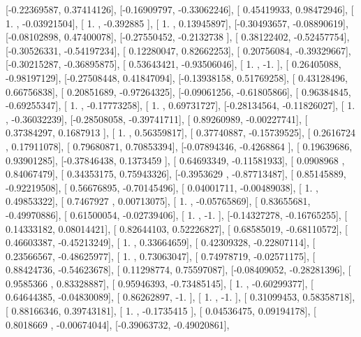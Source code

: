 \documentclass{article}
\begin{document}
       [-0.22369587,  0.37414126],
       [-0.16909797, -0.33062246],
       [ 0.45419933,  0.98472946],
       [ 1.        , -0.03921504],
       [ 1.        , -0.392885  ],
       [ 1.        ,  0.13945897],
       [-0.30493657, -0.08890619],
       [-0.08102898,  0.47400078],
       [-0.27550452, -0.2132738 ],
       [ 0.38122402, -0.52457754],
       [-0.30526331, -0.54197234],
       [ 0.12280047,  0.82662253],
       [ 0.20756084, -0.39329667],
       [-0.30215287, -0.36895875],
       [ 0.53643421, -0.93506046],
       [ 1.        , -1.        ],
       [ 0.26405088, -0.98197129],
       [-0.27508448,  0.41847094],
       [-0.13938158,  0.51769258],
       [ 0.43128496,  0.66756838],
       [ 0.20851689, -0.97264325],
       [-0.09061256, -0.61805866],
       [ 0.96384845, -0.69255347],
       [ 1.        , -0.17773258],
       [ 1.        ,  0.69731727],
       [-0.28134564, -0.11826027],
       [ 1.        , -0.36032239],
       [-0.28508058, -0.39741711],
       [ 0.89260989, -0.00227741],
       [ 0.37384297,  0.1687913 ],
       [ 1.        ,  0.56359817],
       [ 0.37740887, -0.15739525],
       [ 0.2616724 ,  0.17911078],
       [ 0.79680871,  0.70853394],
       [-0.07894346, -0.4268864 ],
       [ 0.19639686,  0.93901285],
       [-0.37846438,  0.1373459 ],
       [ 0.64693349, -0.11581933],
       [ 0.0908968 ,  0.84067479],
       [ 0.34353175,  0.75943326],
       [-0.3953629 , -0.87713487],
       [ 0.85145889, -0.92219508],
       [ 0.56676895, -0.70145496],
       [ 0.04001711, -0.00489038],
       [ 1.        ,  0.49853322],
       [ 0.7467927 ,  0.00713075],
       [ 1.        , -0.05765869],
       [ 0.83655681, -0.49970886],
       [ 0.61500054, -0.02739406],
       [ 1.        , -1.        ],
       [-0.14327278, -0.16765255],
       [ 0.14333182,  0.08014421],
       [ 0.82644103,  0.52226827],
       [ 0.68585019, -0.68110572],
       [ 0.46603387, -0.45213249],
       [ 1.        ,  0.33664659],
       [ 0.42309328, -0.22807114],
       [ 0.23566567, -0.48625977],
       [ 1.        ,  0.73063047],
       [ 0.74978719, -0.02571175],
       [ 0.88424736, -0.54623678],
       [ 0.11298774,  0.75597087],
       [-0.08409052, -0.28281396],
       [ 0.9585366 ,  0.83328887],
       [ 0.95946393, -0.73485145],
       [ 1.        , -0.60299377],
       [ 0.64644385, -0.04830089],
       [ 0.86262897, -1.        ],
       [ 1.        , -1.        ],
       [ 0.31099453,  0.58358718],
       [ 0.88166346,  0.39743181],
       [ 1.        , -0.1735415 ],
       [ 0.04536475,  0.09194178],
       [ 0.8018669 , -0.00674044],
       [-0.39063732, -0.49020861],
\end{document}
